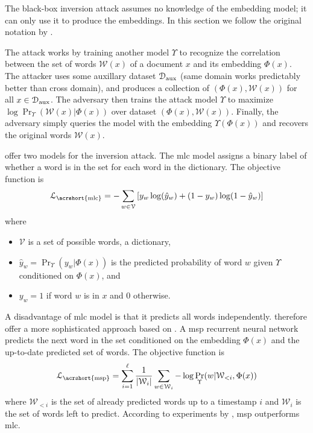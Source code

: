 			The black-box inversion attack assumes no knowledge of the embedding model; it can only use it to produce the embeddings.
			In this section we follow the original notation by \textcite{embedding-attacks}.

			The attack works by training another model $\Upsilon$ to recognize the correlation between the set of words $\mathcal{W}(x)$ of a document $x$ and its embedding $\Phi(x)$.
			The attacker uses some auxillary dataset $\mathcal{D}_\text{aux}$ (same domain works predictably better than cross domain), and produces a collection of $ ( \Phi(x), \mathcal{W}(x) ) $ for all $x \in \mathcal{D}_\text{aux}$.
			The adversary then trains the attack model $\Upsilon$ to maximize $ \log \Pr_\Upsilon ( \mathcal{W}(x) | \Phi(x) ) $ over dataset $ ( \Phi(x), \mathcal{W}(x) ) $.
			Finally, the adversary simply queries the model with the embedding $ \Upsilon( \Phi( x ) ) $ and recovers the original words $\mathcal{W}(x)$.

			\textcite{embedding-attacks} offer two models for the inversion attack.
			The \acrfull{mlc} model assigns a binary label of whether a word is in the set for each word in the dictionary.
			The objective function is
			\[
				\mathcal{L}_{\text{\acrshort{mlc}}} = -\sum_{ w \in \mathcal{V} } \left[ y_w \log( \hat{y}_w ) + (1 - y_w) \log(1 - \hat{y}_w) \right]
			\]
			where
			\begin{itemize}
				\item $\mathcal{V}$ is a set of possible words, a dictionary,
				\item $\hat{y}_w = \Pr_\Upsilon( y_w | \Phi( x ) )$ is the predicted probability of word $w$ given $\Upsilon$ conditioned on $\Phi( x )$, and
				\item $y_w = 1$ if word $w$ is in $x$ and 0 otherwise.
			\end{itemize}

			A disadvantage of \acrshort{mlc} model is that it predicts all words independently.
			\textcite{embedding-attacks} therefore offer a more sophisticated approach based on \cite{msp}.
			A \acrfull{msp} recurrent neural network predicts the next word in the set conditioned on the embedding $\Phi( x )$ and the up-to-date predicted set of words.
			The objective function is
			\[
				\mathcal{L}_{\text{\acrshort{msp}}} = \sum_{ i = 1 }^\ell \frac{1}{| \mathcal{W}_i |} \sum_{w \in \mathcal{W}_i } - \log \Pr_\Upsilon( w | \mathcal{W}_{ < i }, \Phi( x ) )
			\]
			where $\mathcal{W}_{ < i }$ is the set of already predicted words up to a timestamp $i$ and $\mathcal{W}_i$ is the set of words left to predict.
			According to experiments by \textcite{embedding-attacks}, \acrshort{msp} outperforms \acrshort{mlc}.

